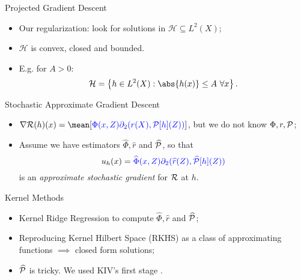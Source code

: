 \documentclass[aspectratio=169]{beamer}
\begin{document}
    \begin{frame}{Projected Gradient Descent}
        \begin{itemize}
            \item<1-> Our regularization: look for solutions in $ \mathcal{H} \subseteq L^2 ( X ) $;
            \item<2-> $ \mathcal{H} $ is convex, closed and bounded.
            \item<3-> E.g. for $ A > 0 $:
        \begin{equation*}
            \mathcal{H} = \left\{ h \in L^2 ( X ) : \abs{ h ( x ) } \leq A \ \forall x \right\}
        .\end{equation*}
        \end{itemize}
    \end{frame}

    \begin{frame}{Stochastic Approximate Gradient Descent}
        \begin{itemize}
            \item<1-> $ \nabla \risk ( h )(x) = \mean [ {\color{blue}\Phi ( x, Z ) \partial_{ 2 } ( r ( X ), \meanop [ h ] ( Z ) )} ] $, but we do not know $ \Phi, r, \mathcal{P} $;
            \item<2->  Assume we have estimators $ \hat{ \Phi }, \hat{ r } $ and $ \widehat{ \mathcal{P} } $, so that
                \begin{equation*}
                    u_{ h } ( x ) = {\color{blue}\widehat{ \Phi } ( x, Z ) \partial_{ 2 } ( \widehat{ r } ( Z ), \widehat{ \mathcal{P} } [ h ] ( Z ) )}
                \end{equation*}
                is an \emph{approximate stochastic gradient} for $ \mathcal{R} $ at $ h $.
        \end{itemize}
    \end{frame}

    \begin{frame}{Kernel Methods}
        \begin{itemize}
            \item<1-> Kernel Ridge Regression to compute $ \hat{ \Phi }, \hat{ r } $ and $ \widehat{ \mathcal{P} } $;
            \item<2-> Reproducing Kernel Hilbert Space (RKHS) as a class of approximating functions $\implies$ closed form solutions;
            \item<3-> $ \widehat{ \mathcal{P} } $ is tricky.
                We used KIV's first stage \cite{singh2019}.
        \end{itemize}
    \end{frame}
\end{document}

